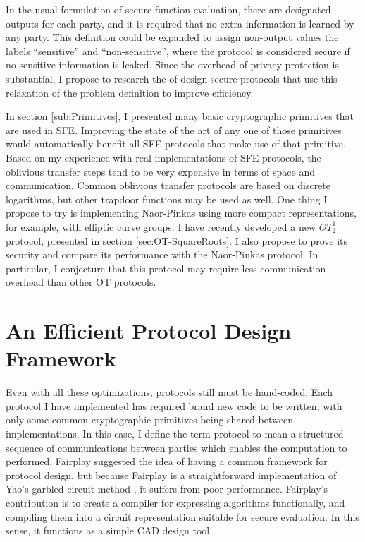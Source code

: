 In the usual formulation of secure function evaluation, there are
designated outputs for each party, and it is required that no extra
information is learned by any party. This definition could be expanded
to assign non-output values the labels {}``sensitive'' and {}``non-sensitive'',
where the protocol is considered secure if no sensitive information
is leaked. Since the overhead of privacy protection is substantial,
I propose to research the of design secure protocols that use this
relaxation of the problem definition to improve efficiency. 

In section \ref{sub:Primitives}, I presented many basic cryptographic
primitives that are used in SFE. Improving the state of the art of
any one of those primitives would automatically benefit all SFE protocols
that make use of that primitive. Based on my experience with real
implementations of SFE protocols, the oblivious transfer steps tend
to be very expensive in terms of space and communication. Common oblivious
transfer protocols are based on discrete logarithms, but other trapdoor
functions may be used as well. One thing I propose to try is implementing
Naor-Pinkas \cite{Noar-Pinkas:2001} using more compact representations,
for example, with elliptic curve groups. I have recently developed
a new $OT_{2}^{1}$ protocol, presented in section \ref{sec:OT-SquareRoots}.
I also propose to prove its security and compare its performance with
the Naor-Pinkas protocol. In particular, I conjecture that this protocol
may require less communication overhead than other OT protocols.


\section{An Efficient Protocol Design Framework}\label{sub:An-Efficient-Framework}

Even with all these optimizations, protocols still must be hand-coded.
Each protocol I have implemented has required brand new code to be
written, with only some common cryptographic primitives being shared
between implementations. In this case, I define the term protocol
to mean a structured sequence of communications between parties which
enables the computation to performed. Fairplay \cite{Fairplay} suggested
the idea of having a common framework for protocol design, but because
Fairplay is a straightforward implementation of Yao's garbled circuit
method \cite{Yao86}, it suffers from poor performance. Fairplay's
contribution is to create a compiler for expressing algorithms functionally,
and compiling them into a circuit representation suitable for secure
evaluation. In this sense, it functions as a simple CAD design tool.

